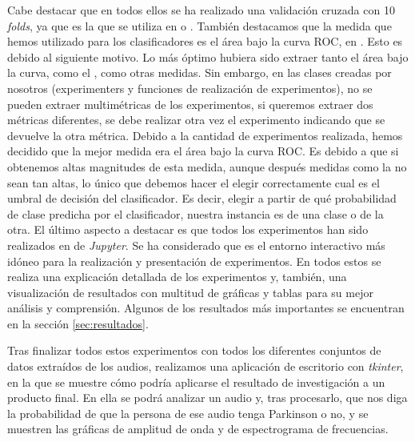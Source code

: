 Cabe destacar que en todos ellos se ha realizado una validación cruzada con 10 \textit{folds}, ya que es la que se utiliza en \cite{Orz2016} o \cite{MxLtAccurate}. También destacamos que la medida que hemos utilizado para los clasificadores es el área bajo la curva ROC,  en . Esto es debido al siguiente motivo. Lo más óptimo hubiera sido extraer tanto el área bajo la curva, como el , como otras medidas. Sin embargo, en las clases creadas por nosotros (experimenters y funciones de realización de experimentos), no se pueden extraer multimétricas de los experimentos, si queremos extraer dos métricas diferentes, se debe realizar otra vez el experimento indicando que se devuelve la otra métrica. Debido a la cantidad de experimentos realizada, hemos decidido que la mejor medida era el área bajo la curva ROC. Es debido a que si obtenemos altas magnitudes de esta medida, aunque después medidas como la  no sean tan altas, lo único que debemos hacer el elegir correctamente cual es el umbral de decisión del clasificador. Es decir, elegir a partir de qué probabilidad de clase predicha por el clasificador, nuestra instancia es de una clase o de la otra. El último aspecto a destacar es que todos los experimentos han sido realizados en  de \textit{Jupyter}. Se ha considerado que es el entorno interactivo más idóneo para la realización y presentación de experimentos. En todos estos  se realiza una explicación detallada de los experimentos y, también, una visualización de resultados con multitud de gráficas y tablas para su mejor análisis y comprensión. Algunos de los resultados más importantes se encuentran en la sección \ref{sec:resultados}.

Tras finalizar todos estos experimentos con todos los diferentes conjuntos de datos extraídos de los audios, realizamos una aplicación de escritorio con \textit{tkinter}, en la que se muestre cómo podría aplicarse el resultado de investigación a un producto final. En ella se podrá analizar un audio y, tras procesarlo, que nos diga la probabilidad de que la persona de ese audio tenga Parkinson o no, y se muestren las gráficas de amplitud de onda y de espectrograma de frecuencias.



